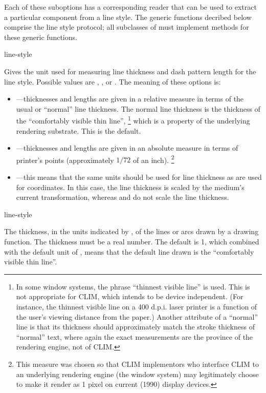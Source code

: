 Each of these suboptions has a corresponding reader that can be used to extract
a particular component from a line style.  The generic functions decribed below
comprise the line style protocol; all subclasses of  must
implement methods for these generic functions.

 {line-style}

Gives the unit used for measuring line thickness and dash pattern length for the
line style.  Possible values are , , or .
The meaning of these options is:

\begin{itemize}
\item {}---thicknesses and lengths are given in a relative measure in
terms of the usual or ``normal'' line thickness.  The normal line thickness is
the thickness of the ``comfortably visible thin line'',
\footnote{In some window systems, the phrase ``thinnest
visible line'' is used.  This is not appropriate for CLIM, which intends to be
device independent.  (For instance, the thinnest visible line on a 400 d.p.i.
laser printer is a function of the user's viewing distance from the paper.)
Another attribute of a ``normal'' line is that its thickness should
approximately match the stroke thickness of ``normal'' text, where again the
exact measurements are the province of the rendering engine, not of CLIM.}
which is a property of the underlying rendering substrate.  This is the default. 

\item {}---thicknesses and lengths are given in an absolute measure in
terms of printer's points (approximately $1/72$ of an inch).
\footnote{This measure was chosen so that CLIM implementors who interface CLIM
to an underlying rendering engine (the window system) may legitimately choose to
make it render as 1 pixel on current (1990) display devices.}

\item {}---this means that the same units should be used for line
thickness as are used for coordinates.  In this case, the line thickness is
scaled by the medium's current transformation, whereas  and
 do not scale the line thickness.
\end{itemize}


 {line-style}

The thickness, in the units indicated by , of the lines or
arcs drawn by a drawing function.  The thickness must be a real number.  The
default is 1, which combined with the default unit of , means that
the default line drawn is the ``comfortably visible thin line''.

